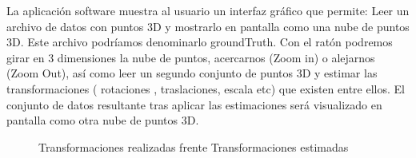 La aplicación software muestra al usuario un interfaz gráfico que permite:
Leer un archivo de datos con puntos 3D y mostrarlo en pantalla como una nube de puntos 3D. Este archivo podríamos denominarlo groundTruth.
Con el ratón podremos girar en 3 dimensiones la nube de puntos, acercarnos  (Zoom in) o alejarnos (Zoom Out), así como leer un segundo conjunto de puntos 3D y estimar las transformaciones ( rotaciones , traslaciones, escala etc) que existen entre ellos. El conjunto de datos resultante tras aplicar las estimaciones será visualizado en pantalla como otra nube de puntos 3D.

\begin{figure}[H]
\begin{center}
\hspace{0.5cm}
\end{center}
\caption{Transformaciones realizadas frente Transformaciones estimadas }
\end{figure}


